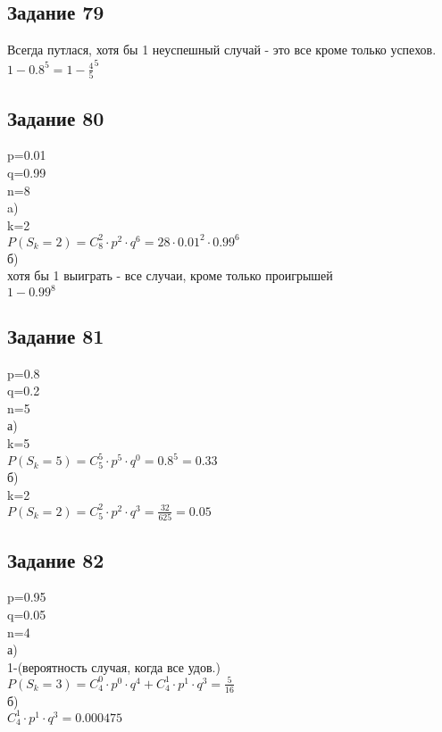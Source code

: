\documentclass[12pt]{article}
\begin{document}
\subsection{Задание 79}
Всегда путлася, хотя бы 1 неуспешный случай  - это все кроме только успехов.\\
$
1-0.8^5=1-\frac{4}{5}^5
$
\newpage
\subsection{Задание 80}
p=0.01\\
q=0.99\\
n=8\\
a)\\
k=2\\
$
P(S_k=2)=C_{8}^{2}\cdot p^2\cdot q^6 =  28 \cdot 0.01^2\cdot 0.99^6
$\\
б)\\
хотя бы 1 выиграть - все случаи, кроме только проигрышей\\
$
1-0.99^8
$
\newpage
\subsection{Задание 81}
p=0.8\\
q=0.2\\
n=5\\
а)\\
k=5\\
$
P(S_k=5)=C_{5}^{5}\cdot p^5\cdot q^0=0.8^5=0.33
$\\
б)\\
k=2\\
$
P(S_k=2)=C_{5}^{2}\cdot p^2\cdot q^3=\frac{32}{625}=0.05
$
\newpage
\subsection{Задание 82}
p=0.95\\
q=0.05\\
n=4\\
а)\\
1-(вероятность случая, когда все удов.)\\
$
P(S_k=3)=C_{4}^{0}\cdot p^0\cdot q^4 + C_{4}^{1}\cdot p^1\cdot q^3 =  \frac{5}{16} 
$\\
б)\\
$
C_{4}^{1}\cdot p^1\cdot q^3 =  0.000475 
$
\end{document}
